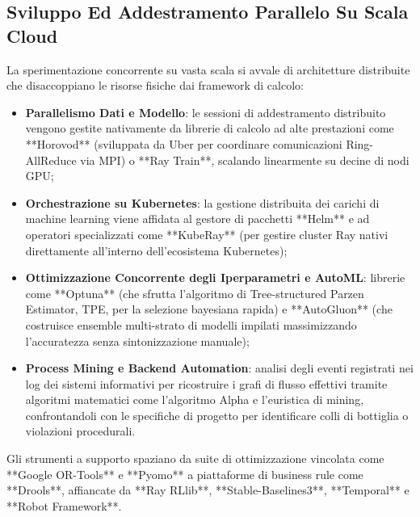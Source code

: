 \documentclass[11pt, a4paper]{article}
\begin{document}

\subsection{Sviluppo Ed Addestramento Parallelo Su Scala Cloud}

La sperimentazione concorrente su vasta scala si avvale di architetture distribuite che disaccoppiano le risorse fisiche dai framework di calcolo:
\begin{itemize}
    \item \textbf{Parallelismo Dati e Modello}: le sessioni di addestramento distribuito vengono gestite nativamente da librerie di calcolo ad alte prestazioni come **Horovod** (sviluppata da Uber per coordinare comunicazioni Ring-AllReduce via MPI) o **Ray Train**, scalando linearmente su decine di nodi GPU;
    \item \textbf{Orchestrazione su Kubernetes}: la gestione distribuita dei carichi di machine learning viene affidata al gestore di pacchetti **Helm** e ad operatori specializzati come **KubeRay** (per gestire cluster Ray nativi direttamente all'interno dell'ecosistema Kubernetes);
    \item \textbf{Ottimizzazione Concorrente degli Iperparametri e AutoML}: librerie come **Optuna** (che sfrutta l'algoritmo di Tree-structured Parzen Estimator, TPE, per la selezione bayesiana rapida) e **AutoGluon** (che costruisce ensemble multi-strato di modelli impilati massimizzando l'accuratezza senza sintonizzazione manuale);
    \item \textbf{Process Mining e Backend Automation}: analisi degli eventi registrati nei log dei sistemi informativi per ricostruire i grafi di flusso effettivi tramite algoritmi matematici come l'algoritmo Alpha e l'euristica di mining, confrontandoli con le specifiche di progetto per identificare colli di bottiglia o violazioni procedurali.
\end{itemize}

Gli strumenti a supporto spaziano da suite di ottimizzazione vincolata come **Google OR-Tools** e **Pyomo** a piattaforme di business rule come **Drools**, affiancate da **Ray RLlib**, **Stable-Baselines3**, **Temporal** e **Robot Framework**.

\end{document}
